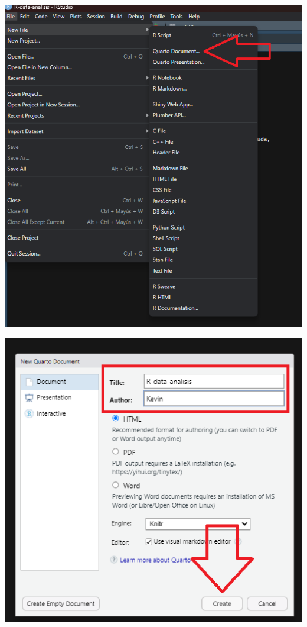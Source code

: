 \documentclass[
  letterpaper,
  DIV=11,
  numbers=noendperiod]{scrartcl}
\begin{document}
\includegraphics{images/quarto-2.png}

\includegraphics{images/quarto2-2.png}
\end{document}
